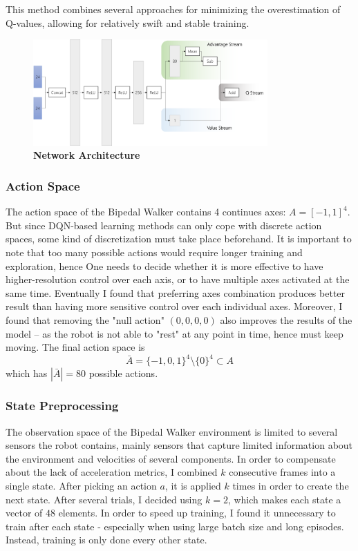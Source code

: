 \documentclass{article}
\begin{document}
\begin{multicols}{2}
This method combines several approaches for minimizing the overestimation of Q-values, allowing for relatively swift and stable training.

\begin{figure}
\begin{center}


\includegraphics[width=0.8\textwidth]{network}
\caption{\label{fig:network}
\textbf{Network Architecture}
}
\end{center}
\end{figure}

\subsubsection{Action Space}
The action space of the Bipedal Walker contains 4 continues axes: $A=[-1,1]^4$. But since DQN-based learning methods can only cope with discrete action spaces, some kind of discretization must take place beforehand. It is important to note that too many possible actions would require longer training and exploration, hence One needs to decide whether it is more effective to have higher-resolution control over each axis, or to have multiple axes activated at the same time. Eventually I found that preferring axes combination produces better result than having more sensitive control over each individual axes. Moreover, I found that removing the "null action" $(0,0,0,0)$ also improves the results of the model -- as the robot is not able to "rest" at any point in time, hence must keep moving.
The final action space is 
$$\bar{A}=\{-1,0,1\}^4 \setminus \{0\}^4 \subset A$$ which has $|\bar{A}|=80$ possible actions.

\subsubsection{State Preprocessing}
The observation space of the Bipedal Walker environment is limited to several sensors the robot contains, mainly sensors that capture limited information about the environment and velocities of several components. In order to compensate about the lack of acceleration metrics, I combined $k$ consecutive frames into a single state. After picking an action $a$, it is applied $k$ times in order to create the next state. After several trials, I decided using $k=2$, which makes each state a vector of $48$ elements. 
In order to speed up training, I found it unnecessary to train after each state - especially when using large batch size and long episodes. Instead, training is only done every other state.


\end{multicols}
\end{document}
